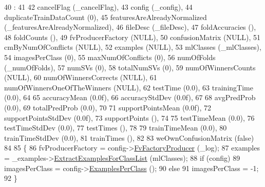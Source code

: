 \begin{DoxyCode}
40                                   :
41 
42    cancelFlag                   (\_cancelFlag),
43    config                       (\_config),
44    duplicateTrainDataCount      (0),
45    featuresAreAlreadyNormalized (\_featuresAreAlreadyNormalized),
46    fileDesc                     (\_fileDesc),
47    foldAccuracies               (),
48    foldCounts                   (),
49    fvProducerFactory            (NULL),
50    confusionMatrix              (NULL),
51    cmByNumOfConflicts           (NULL),
52    examples                     (NULL),
53    mlClasses                    (\_mlClasses),
54    imagesPerClass               (0),
55    maxNumOfConflicts            (0),
56    numOfFolds                   (\_numOfFolds),
57    numSVs                       (0),
58    totalNumSVs                  (0),
59    numOfWinnersCounts           (NULL),
60    numOfWinnersCorrects         (NULL),
61    numOfWinnersOneOfTheWinners  (NULL),
62    testTime                     (0.0),
63    trainingTime                 (0.0),
64 
65    accuracyMean                 (0.0f),
66    accuracyStdDev               (0.0f),
67 
68    avgPredProb                  (0.0),
69    totalPredProb                (0.0),
70 
71    supportPointsMean            (0.0f),
72    supportPointsStdDev          (0.0f),
73    supportPoints                (),
74 
75    testTimeMean                 (0.0),
76    testTimeStdDev               (0.0),
77    testTimes                    (),
78 
79    trainTimeMean                (0.0),
80    trainTimeStdDev              (0.0),
81    trainTimes                   (),
82 
83    weOwnConfusionMatrix         (\textcolor{keyword}{false})
84 
85 \{
86   fvProducerFactory = config->\hyperlink{class_k_k_m_l_l_1_1_training_configuration2_ad6811462fc7d1000552e4e6084d5a67d}{FvFactoryProducer} (\_log);
87   examples = \_examples->\hyperlink{class_k_k_m_l_l_1_1_feature_vector_list_aefe3f4ebf6eeff999b291799195b76c0}{ExtractExamplesForClassList} (mlClasses);
88   \textcolor{keywordflow}{if}  (config)
89     imagesPerClass = config->\hyperlink{class_k_k_m_l_l_1_1_training_configuration2_a0fd5f237bd46a228c710369aacc84632}{ExamplesPerClass} ();
90   \textcolor{keywordflow}{else}
91      imagesPerClass = -1;
92 \}
\end{DoxyCode}

